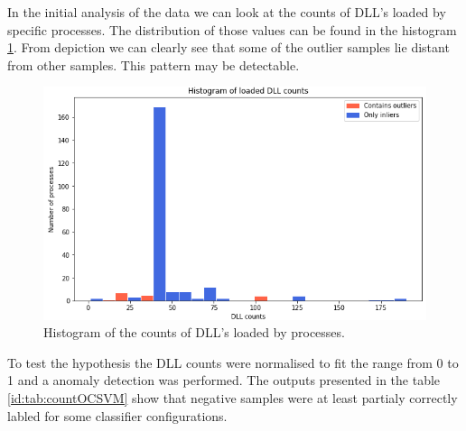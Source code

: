 \documentclass[a4paper,twoside,12pt]{book}
\begin{document}
In the initial analysis of the data we can look at the counts of DLL's loaded by specific 
processes. The distribution of those values can be found in the histogram \ref{fig:dllCounts}. 
From depiction we can clearly see that some of the outlier samples lie distant from other 
samples. This pattern may be detectable. 

\begin{figure}
	\centering
	\includegraphics[scale=0.9]{images/DLLcounts}
	\caption{Histogram of the counts of DLL's loaded by processes.}
	\label{fig:dllCounts}
 \end{figure}

To test the hypothesis the DLL counts were normalised to fit the range from 0 to 1 and a anomaly 
detection was performed. The outputs presented in the table \ref{id:tab:countOCSVM} show that 
negative samples were at least partialy correctly labled for some classifier configurations.
\end{document}
